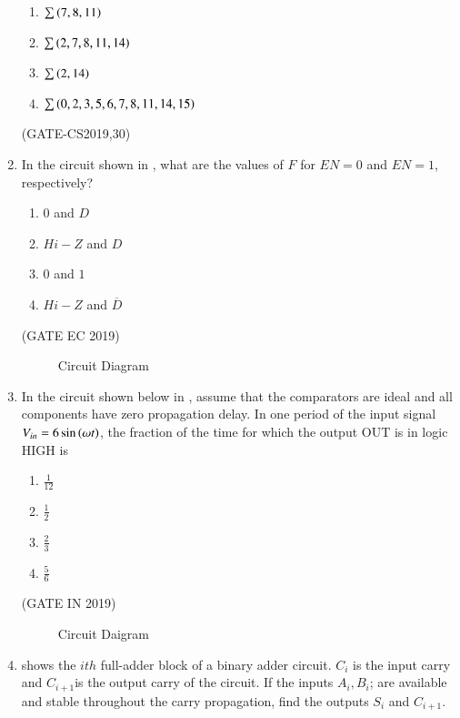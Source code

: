 \begin{enumerate}[label=\arabic*.,ref=\theenumi]
		\begin{enumerate}
		\item $\sum\left(7,8,11\right)$
		\item $\sum\left(2,7,8,11,14\right)$
		\item $\sum\left(2,14\right)$
		\item $\sum\left(0,2,3,5,6,7,8,11,14,15\right)$
		\end{enumerate}
%
	\hfill(GATE-CS2019,30)
	\begin{figure}[H]
		 \centering
		 \resizebox{0.5\columnwidth}{!}{%
			
			}
                 \caption{}
	\label{fig:GATE-CS2019,30}
	\end{figure}
\item In the circuit shown
	in ,
	what are the values of $F$ for $EN=0$ and $EN=1$,  respectively?
\begin{enumerate}
    \item $0$ and $D$
    \item $Hi-Z$ and $D$
    \item $0$ and $1$
    \item $Hi-Z$ and $\overline{D}$
\end{enumerate}
 \hfill(GATE EC 2019)  
%
\begin{figure}[H]
    \centering
    \resizebox{0.5\columnwidth}{!}{%
    
	}
    \caption{Circuit Diagram}
	\label{fig:GATE-EC2019,14} 
\end{figure}
\item In the circuit shown below in 
	    ,
	 assume that the comparators are ideal and all components have zero propagation delay. In one period of the input signal $V_{in}=6\sin\left(\omega t\right)$, the fraction of the time for which the output OUT is in logic HIGH is 
\begin{enumerate}[itemsep=1ex]
	\item $\frac{1}{12}$
	\item $\frac{1}{2}$
	\item $\frac{2}{3}$
	\item $\frac{5}{6}$
\end{enumerate}
		                 \hfill(GATE IN 2019)
\begin{figure}[H]
\centering
\resizebox{0.75\columnwidth}{!}{%
    
	}
	    \caption{Circuit Daigram}
	    \label{fig:GATE-IN2019,34}
     \end{figure}


\item 
	shows the $ith$ full-adder block of a binary adder circuit. $C_i$ is the input carry and $C_{i+1}$is the output carry of the circuit.  If the inputs $A_i, B_i$; are available and stable throughout the carry propagation, find the outputs $S_i$ and $C_{i+1}$.


\end{enumerate}

